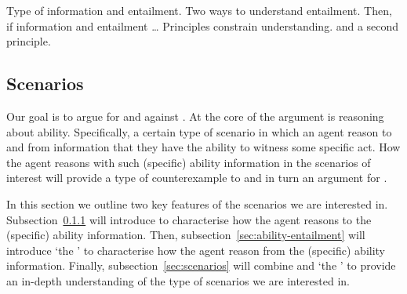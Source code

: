 \begin{note}
  Type of information and entailment.
  Two ways to understand entailment.
  Then, if information and entailment \dots
  Principles constrain understanding.
  \ESU{} and a second principle.
\end{note}

\subsection{Scenarios}
\label{sec:cases-interest}

Our goal is to argue for \EAS{} and against \ESU{}.
At the core of the argument is reasoning about ability.
Specifically, a certain type of scenario in which an agent reason to and from information that they have the ability to witness some specific act.
How the agent reasons with such (specific) ability information in the scenarios of interest will provide a type of counterexample to \ESU{} and in turn an argument for \EAS{}.

In this section we outline two key features of the scenarios we are interested in.
Subsection~\ref{sec:type-scenario} will introduce \gsi{-} to characterise how the agent reasons to the (specific) ability information.
Then, subsection~\ref{sec:ability-entailment} will introduce `the \aben{}' to characterise how the agent reason from the (specific) ability information.
Finally, subsection~\ref{sec:scenarios} will combine \gsi{-} and `the \aben{}' to provide an in-depth understanding of the type of scenarios we are interested in.

\subsubsection{\Gsi{-}}
\label{sec:type-scenario}

